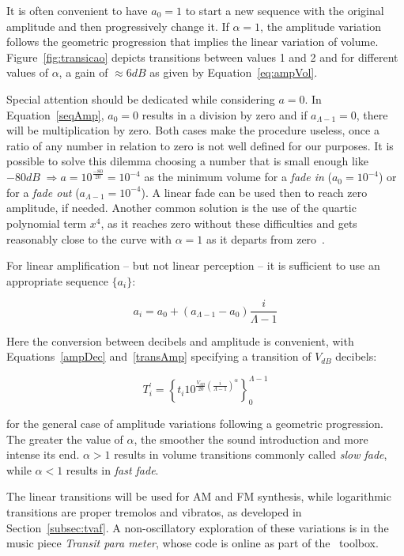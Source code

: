 It is often convenient to have $a_0=1$ to start a new sequence with the original amplitude and then progressively change it.
If $\alpha=1$, the amplitude variation follows the geometric progression that implies the linear variation of volume. Figure~\ref{fig:transicao} depicts transitions between values 1 and 2 and for different values of $\alpha$, a gain of $\approx 6dB$ as given by Equation~\ref{eq:ampVol}.

Special attention should be dedicated while considering $a=0$.
In Equation~\ref{seqAmp}, $a_0=0$ results in a division by zero and if $a_{\Lambda-1}=0$, there will be multiplication by zero. Both cases make the procedure useless, once a ratio of any number in relation to zero is not well defined for our purposes. It is possible to solve this dilemma choosing a number that is small enough like $-80dB\;\Rightarrow a=10^{\frac{-80}{20}}=10^{-4}$ as the minimum volume for a \emph{fade in} ($a_0=10^{-4}$) or for a \emph{fade out} ($a_{\Lambda-1}=10^{-4}$). A linear fade can be used then to reach zero amplitude, if needed. Another common solution is the use of the quartic polynomial term $x^4$, as it reaches zero without these difficulties and gets reasonably close to the curve with $\alpha=1$ as it departs from zero~\cite{Cook}.

For linear amplification -- but not linear perception -- it is sufficient to use an appropriate sequence $\{a_i\}$:

\begin{equation}\label{seqAmpLin}
a_i=a_0 + (a_{\Lambda-1}-a_0)\frac{i}{\Lambda-1}
\end{equation}

Here the conversion between decibels and amplitude is convenient, with Equations~\ref{ampDec} and~\ref{transAmp} specifying a transition of $V_{dB}$ decibels:

\begin{equation}\label{seqAmpDB}
T_i^{'}=\left\{ t_i 10^{\frac{V_{dB}}{20}\left( \frac{i}{\Lambda-1} \right)^\alpha} \right\}_0^{\Lambda-1}
\end{equation}

\noindent for the general case of amplitude variations following a geometric progression. The greater the value of $\alpha$, the smoother the sound introduction and more intense its end. $\alpha>1$ results in volume transitions commonly called \emph{slow fade}, while $\alpha<1$ results in \emph{fast fade}\cite{guillaume}.

The linear transitions will be used for AM and FM synthesis, while logarithmic transitions are proper tremolos and vibratos, as developed in Section~\ref{subsec:tvaf}. A non-oscillatory exploration of these variations is in the music piece \emph{Transit para meter}, whose code is online as part of the \massa\ toolbox\cite{MASSA}.


